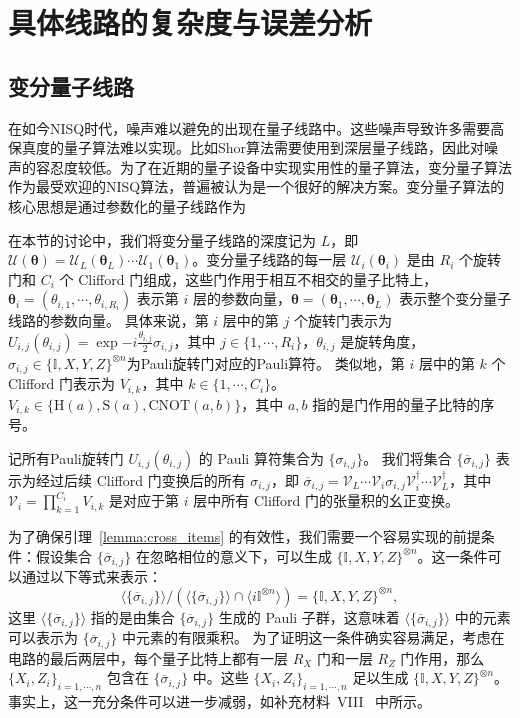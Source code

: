 \chapter{具体线路的复杂度与误差分析}

\section{变分量子线路}
在如今NISQ时代，噪声难以避免的出现在量子线路中。这些噪声导致许多需要高保真度的量子算法难以实现。比如Shor算法需要使用到深层量子线路，因此对噪声的容忍度较低。为了在近期的量子设备中实现实用性的量子算法，变分量子算法作为最受欢迎的NISQ算法，普遍被认为是一个很好的解决方案。变分量子算法的核心思想是通过参数化的量子线路作为

在本节的讨论中，我们将变分量子线路的深度记为 $L$，即 $\mathcal{U}(\bm{\theta})=\mathcal{U}_L(\bm{\theta}_L)\cdots\mathcal{U}_1(\bm{\theta}_1)$。变分量子线路的每一层 $\mathcal{U}_i(\bm{\theta}_i)$ 是由 $R_i$ 个旋转门和 $C_i$ 个 Clifford 门组成，这些门作用于相互不相交的量子比特上，$\bm{\theta}_i=(\theta_{i,1},\cdots,\theta_{i,R_i})$ 表示第 $i$ 层的参数向量，$\bm{\theta}=(\bm{\theta}_1,\cdots,\bm{\theta}_L)$ 表示整个变分量子线路的参数向量。
具体来说，第 $i$ 层中的第 $j$ 个旋转门表示为 $U_{i, j}(\theta_{i,j})=\exp{-i \frac{\theta_{i,j}}{2} \sigma_{i,j}}$，其中 $j \in \{1, \cdots , R_i\}$，$\theta_{i,j}$ 是旋转角度，$\sigma_{i, j}\in \{\mathbb{I}, X,Y,Z\}^{\otimes n}$为Pauli旋转门对应的Pauli算符。
类似地，第 $i$ 层中的第 $k$ 个 Clifford 门表示为 $V_{i,k}$，其中 $k \in \{1, \cdots , C_i\}$。$V_{i,k}\in\{\mathrm{H}(a),\mathrm{S}(a),\mathrm{CNOT}(a,b)\}$，其中 $a,b $ 指的是门作用的量子比特的序号。

记所有Pauli旋转门 $U_{i,j}(\theta_{i,j})$ 的 Pauli 算符集合为 $\{\sigma_{i,j}\}$。
我们将集合 $\{\overline{\sigma}_{i,j}\}$ 表示为经过后续 Clifford 门变换后的所有 $\sigma_{i,j}$，即 $\overline{\sigma}_{i,j}= \mathcal{V}_{L} \cdots \mathcal{V}_{i} \sigma_{i,j} \mathcal{V}_{i}^\dagger \cdots \mathcal{V}_{L}^\dagger$，其中 $\mathcal{V}_{i} = \prod_{k=1}^{C_i} V_{i,k}$ 是对应于第 $i$ 层中所有 Clifford 门的张量积的幺正变换。

为了确保引理~\ref{lemma:cross_items} 的有效性，我们需要一个容易实现的前提条件：假设集合 $\{\overline{\sigma}_{i,j}\}$ 在忽略相位的意义下，可以生成 $\{\mathbb{I}, X, Y, Z\}^{\otimes n}$。这一条件可以通过以下等式来表示：
\begin{equation}\label{eq:generate}
  \langle \{\overline{\sigma}_{i,j}\}\rangle/\left(\langle \{\overline{\sigma}_{i,j}\}\rangle\cap\langle i\mathbb{I}^{\otimes n}\rangle\right)=\{\mathbb{I},X,Y,Z\}^{\otimes n},
\end{equation}
这里 $\langle \{\overline{\sigma}_{i,j}\} \rangle$ 指的是由集合 $\{\overline{\sigma}_{i,j}\}$ 生成的 Pauli 子群，这意味着 $\langle \{\overline{\sigma}_{i,j}\}\rangle$ 中的元素可以表示为 $\{\overline{\sigma}_{i,j}\}$ 中元素的有限乘积。
为了证明这一条件确实容易满足，考虑在电路的最后两层中，每个量子比特上都有一层 $R_X$ 门和一层 $R_Z$ 门作用，那么 $\{X_i, Z_i\}_{i=1,\cdots,n}$ 包含在 $\{\overline{\sigma}_{i,j}\}$ 中。这些 $\{ X_i,Z_i \}_{i=1,\cdots,n}$ 足以生成 $\{\mathbb{I},X,Y,Z\}^{\otimes n}$。事实上，这一充分条件可以进一步减弱，如补充材料~{VIII}~\cite{supplementary} 中所示。


